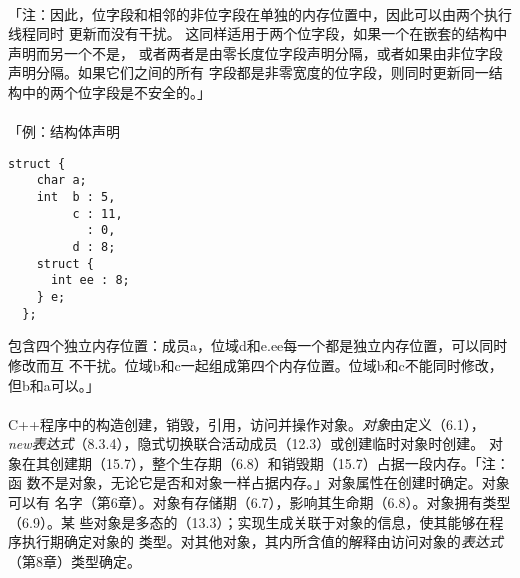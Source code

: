 \paragraph{}
「注：因此，位字段和相邻的非位字段在单独的内存位置中，因此可以由两个执行线程同时
更新而没有干扰。 这同样适用于两个位字段，如果一个在嵌套的结构中声明而另一个不是，
或者两者是由零长度位字段声明分隔，或者如果由非位字段声明分隔。如果它们之间的所有
字段都是非零宽度的位字段，则同时更新同一结构中的两个位字段是不安全的。」

\paragraph{}
「例：结构体声明
\begin{lstlisting}[mathescape]
  struct {
    char a;
    int  b : 5,
         c : 11,
           : 0,
         d : 8;
    struct {
      int ee : 8;
    } e;
  };
\end{lstlisting}
包含四个独立内存位置：成员a，位域d和e.ee每一个都是独立内存位置，可以同时修改而互
不干扰。位域b和c一起组成第四个内存位置。位域b和c不能同时修改，但b和a可以。」


\paragraph{}
C++程序中的构造创建，销毁，引用，访问并操作对象。\textit{对象}由定义（6.1），
\textit{new表达式}（8.3.4），隐式切换联合活动成员（12.3）或创建临时对象时创建。
对象在其创建期（15.7），整个生存期（6.8）和销毁期（15.7）占据一段内存。「注：函
数不是对象，无论它是否和对象一样占据内存。」对象属性在创建时确定。对象可以有
名字（第6章）。对象有存储期（6.7），影响其生命期（6.8）。对象拥有类型（6.9）。某
些对象是多态的（13.3）；实现生成关联于对象的信息，使其能够在程序执行期确定对象的
类型。对其他对象，其内所含值的解释由访问对象的\textit{表达式}（第8章）类型确定。

